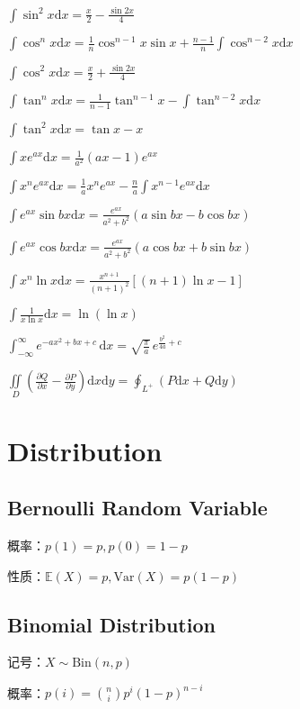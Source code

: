 \documentclass[9pt,landscape]{article}
\begin{document}
\begin{multicols}{3}
$ \int \sin ^{2}x{\mbox{d}}x={\frac {x}{2}}-{\frac {\sin {2x}}{4}} $

$ \int \cos ^{n}x{\mbox{d}}x={\frac {1}{n}}\cos ^{n-1}x\sin x+{\frac {n-1}{n}}\int \cos ^{n-2}x{\mbox{d}}x\quad $

$ \int \cos ^{2}x{\mbox{d}}x={\frac {x}{2}}+{\frac {\sin {2x}}{4}} $

$ \int \tan ^{n}x{\mbox{d}}x={\frac {1}{n-1}}\tan ^{n-1}x-\int \tan ^{n-2}x{\mbox{d}}x\quad $

$ \int \tan ^{2}x{\mbox{d}}x=\tan x-x $

$ \int xe^{ax}{\mbox{d}}x={\frac {1}{a^{2}}}(ax-1)e^{ax} $

$ \int x^{n}e^{ax}{\mbox{d}}x={\frac {1}{a}}x^{n}e^{ax}-{\frac {n}{a}}\int x^{n-1}e^{ax}{\mbox{d}}x $

$ \int e^{ax}\sin bx{\mbox{d}}x={\frac {e^{ax}}{a^{2}+b^{2}}}(a\sin bx-b\cos bx) $

$ \int e^{ax}\cos bx{\mbox{d}}x={\frac {e^{ax}}{a^{2}+b^{2}}}(a\cos bx+b\sin bx) $

$ \int x^{n}\ln x{\mbox{d}}x={\frac {x^{n+1}}{(n+1)^{2}}}[(n+1)\ln x-1] $

$ \int {\frac {1}{x\ln {x}}}{\mbox{d}}x=\ln {(\ln {x})} $

$ \int _{-\infty }^{\infty }e^{-ax^{2}+bx+c}\,\mathrm{d}x={\sqrt {\frac {\pi }{a}}}\,e^{{\frac {b^{2}}{4a}}+c} $

$ \iint \limits _{D}\left({\frac {\partial Q}{\partial x}}-{\frac {\partial P}{\partial y}}\right)\mathrm {d} x\mathrm {d} y=\oint _{L^{+}}(P\mathrm {d} x+Q\mathrm {d} y) $

\section{Distribution}

\subsection{Bernoulli Random Variable}

概率：$p(1)=p, p(0)=1-p$

性质：$\mathbb{E}(X)=p,\text{Var}(X)=p(1-p)$

\subsection{Binomial Distribution}
记号：$X\sim \mathrm{Bin}(n,p)$

概率：$p(i)=\binom{n}{i}p^i(1-p)^{n-i}$


\end{multicols}
\end{document}
